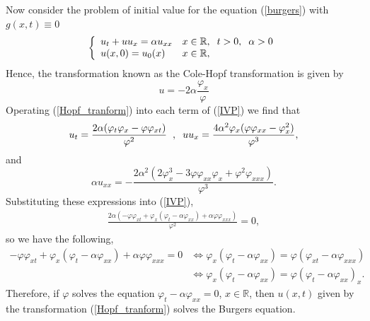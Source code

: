    	\noindent Now consider the problem of initial value for the equation (\ref{burgers}) with $g(x, t) \equiv 0$
    \begin{equation}
        \left \lbrace \begin{array}{ll}
    	u_t + u u_x = \alpha u_{xx} & x \in \mathbb{R}, \hspace{2mm} t > 0, \hspace{2mm} \alpha > 0 \\
    	u (x, 0) = u_0 (x)  & x \in \mathbb{R},
    	\end{array}  \right .
    	\label{IVP}
    \end{equation}
	Hence, the transformation known as the Cole-Hopf transformation is given by
    \begin{equation}
        u = -2 \alpha \frac{\varphi_x}{\varphi}
        \label{Hopf_tranform}
    \end{equation}
    Operating (\ref{Hopf_tranform}) into each term of (\ref{IVP}) we find that
    \begin{equation*}
        u_t = \frac{2 \alpha (\varphi_t \varphi_x - \varphi \varphi_{x t})}{\varphi^2} \hspace{2mm} , \hspace{2mm} u u_x = \frac{4 \alpha^2 \varphi_x (\varphi \varphi_{xx} - \varphi^2_x)}{\varphi^3},
    \end{equation*}
    and 
    \begin{equation*}
        \alpha u_{xx} = - \frac{2 \alpha^2 (2 \varphi_x^3 - 3 \varphi \varphi_{xx} \varphi_x + \varphi^2 \varphi_{xxx})}{\varphi^3}.
    \end{equation*}
    Substituting these expressions into (\ref{IVP}),
    \begin{align*}
        \frac{2 \alpha (-\varphi \varphi_{x t} +  \varphi_x ( \varphi_t - \alpha \varphi_{xx}) + \alpha \varphi \varphi_{xxx})}{\varphi^2} = 0, 
    \end{align*}
	so we have the following,
	\begin{align*}    
        - \varphi \varphi_{x t} + \varphi_x (\varphi_t - \alpha \varphi_{xx}) + \alpha \varphi \varphi_{xxx} = 0 &\Longleftrightarrow \varphi_x (\varphi_t - \alpha \varphi_{xx}) = \varphi (\varphi_{x t} - \alpha \varphi_{xxx}) \\
        &\Longleftrightarrow \varphi_x (\varphi_t - \alpha \varphi_{xx}) =  \varphi (\varphi_t - \alpha \varphi_{xx})_x.
    \end{align*}
    Therefore, if $\varphi$ solves the equation $\varphi_t - \alpha \varphi_{xx} = 0$, $x \in \mathbb{R}$, then $u(x, t)$ given by the transformation (\ref{Hopf_tranform}) solves the Burgers equation.\\
    
